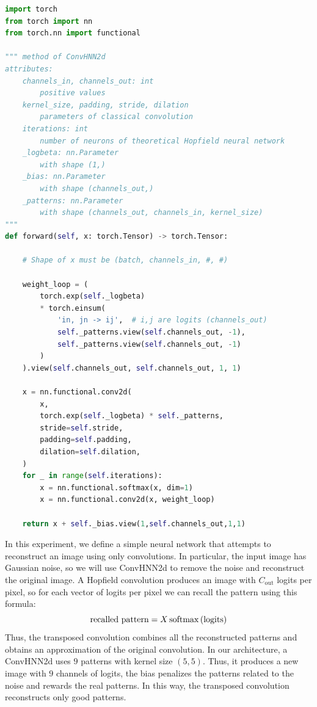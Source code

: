 \newpage
\begin{lstlisting}[style=code, label=alg:CNN_forward, caption=ConvHNN2d forward pass, language=Python]
import torch
from torch import nn
from torch.nn import functional

""" method of ConvHNN2d
attributes:
    channels_in, channels_out: int
        positive values
    kernel_size, padding, stride, dilation
        parameters of classical convolution
    iterations: int
        number of neurons of theoretical Hopfield neural network
    _logbeta: nn.Parameter
        with shape (1,)
    _bias: nn.Parameter
        with shape (channels_out,)
    _patterns: nn.Parameter
        with shape (channels_out, channels_in, kernel_size)
"""
def forward(self, x: torch.Tensor) -> torch.Tensor:

    # Shape of x must be (batch, channels_in, #, #)

    weight_loop = (
        torch.exp(self._logbeta)
        * torch.einsum(
            'in, jn -> ij',  # i,j are logits (channels_out)
            self._patterns.view(self.channels_out, -1),
            self._patterns.view(self.channels_out, -1)
        )
    ).view(self.channels_out, self.channels_out, 1, 1)

    x = nn.functional.conv2d(
        x,
        torch.exp(self._logbeta) * self._patterns,
        stride=self.stride,
        padding=self.padding,
        dilation=self.dilation,
    )
    for _ in range(self.iterations):
        x = nn.functional.softmax(x, dim=1)
        x = nn.functional.conv2d(x, weight_loop)

    return x + self._bias.view(1,self.channels_out,1,1)
\end{lstlisting}

\noindent In this experiment, we define a simple neural network that attempts to reconstruct an image using only convolutions. In particular, the input image has Gaussian noise, so we will use ConvHNN2d to remove the noise and reconstruct the original image. A Hopfield convolution produces an image with $C_{\text{out}}$ logits per pixel, so for each vector of logits per pixel we can recall the pattern using this formula:
$$
    \text{recalled pattern} = X\operatorname{softmax}\left(\text{logits}\right)
$$
Thus, the transposed convolution combines all the reconstructed patterns and obtains an approximation of the original convolution. In our architecture, a ConvHNN2d uses $9$ patterns with kernel size $(5,5)$. Thus, it produces a new image with $9$ channels of logits, the bias penalizes the patterns related to the noise and rewards the real patterns. In this way, the transposed convolution reconstructs only good patterns.


